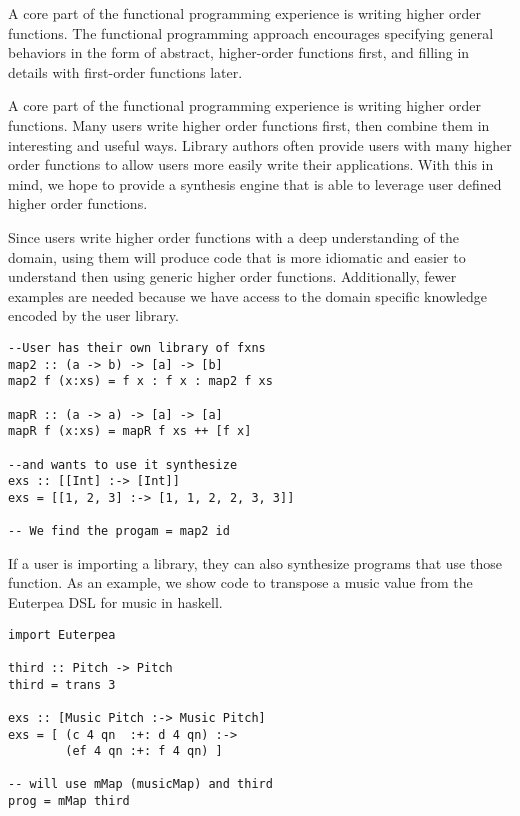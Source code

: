 A core part of the functional programming experience is writing higher order functions. The functional programming approach encourages specifying general behaviors in the form of abstract, higher-order functions first, and filling in details with first-order functions later.

A core part of the functional programming experience is writing higher order functions. Many users write higher order functions first, then combine them in interesting and useful ways. Library authors often provide users with many higher order functions to allow users more easily write their applications. With this in mind, we hope to provide a synthesis engine that is able to leverage user defined higher order functions.

Since users write higher order functions with a deep understanding of the domain, using them will produce code that is more idiomatic and easier to understand then using generic higher order functions. Additionally, fewer examples are needed because we have access to the domain specific knowledge encoded by the user library.

\begin{verbatim}
--User has their own library of fxns
map2 :: (a -> b) -> [a] -> [b]
map2 f (x:xs) = f x : f x : map2 f xs

mapR :: (a -> a) -> [a] -> [a]
mapR f (x:xs) = mapR f xs ++ [f x]

--and wants to use it synthesize
exs :: [[Int] :-> [Int]]
exs = [[1, 2, 3] :-> [1, 1, 2, 2, 3, 3]]

-- We find the progam = map2 id
\end{verbatim}


If a user is importing a library, they can also synthesize programs that use those function. As an example, we show code to transpose a music value from the Euterpea DSL for music in haskell.

\begin{verbatim}
import Euterpea

third :: Pitch -> Pitch
third = trans 3

exs :: [Music Pitch :-> Music Pitch]
exs = [ (c 4 qn  :+: d 4 qn) :->
        (ef 4 qn :+: f 4 qn) ]
        
-- will use mMap (musicMap) and third
prog = mMap third
\end{verbatim}
